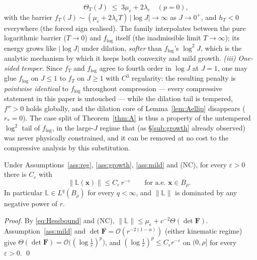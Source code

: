 \begin{remark}
\begin{equation*}
        \qquad
        \Theta_T(J)\;\le\;3\mu_e+2\lambda_e \quad (p=0),
    \end{equation*}
    with the barrier $f_T(J)\sim(\mu_e+2\lambda_e T)\,|\log J|\to\infty$ as $J\to0^+$, and $h_T<0$ everywhere
    (the forced sign realised). The family interpolates between the pure logarithmic barrier ($T\to0$) and $f_{\log}$
    itself (the inadmissible limit $T\to\infty$); its energy grows like $|\log J|$ under dilation, \emph{softer} than
    $f_{\log}$'s $\log^2 J$, which is the analytic mechanism by which it keeps both convexity and mild growth.
    \emph{(iii) One-sided temper.} Since $f_T$ and $f_{\log}$ agree to fourth order in $\log J$ at $J=1$, one may glue
    $f_{\log}$ on $J\le1$ to $f_T$ on $J\ge1$ with $C^3$ regularity: the resulting penalty is \emph{pointwise
    identical} to $f_{\log}$ throughout compression --- every compressive statement in this paper is untouched ---
    while the dilation tail is tempered, $f''>0$ holds globally, and the dilation core of Lemma~\ref{lem:Aellip}
    disappears ($r_*=0$). The case split of Theorem~\ref{thm:A} is thus a property of the untempered $\log^2$ tail of
    $f_{\log}$, in the large-$J$ regime that (as \S\ref{sub:growth} already observed) was never physically
    constrained, and it can be removed at no cost to the compressive analysis by this substitution.
\end{remark}

\begin{lemma}
    \label{lem:Abound}
    Under Assumptions~\ref{ass:reg}, \ref{ass:growth}, \ref{ass:mild} and (NC), for every $\varepsilon>0$ there is
    $C_\varepsilon$ with
    \begin{equation}
        \label{eq:subord}
        \|\mathbb{L}(\bm{x})\| \le C_\varepsilon\, r^{-\varepsilon} \qquad \text{for a.e. } \bm{x}\in B_\rho .
    \end{equation}
    In particular $\mathbb{L}\in L^q(B_\rho)$ for every $q<\infty$, and $\|\mathbb{L}\|$ is dominated by any negative
    power of $r$.
\end{lemma}

\begin{proof}
    By \eqref{eq:Hessbound} and (NC), $\|\mathbb{L}\|\le \mu_e + c^{-2}\Theta(\det\bm{F})$. Assumption~\ref{ass:mild}
    and $\det\bm{F}=\mathcal{O}(r^{-2(1-\alpha)})$ (either kinematic regime) give
    $\Theta(\det\bm{F})=\mathcal{O}\big((\log\tfrac1r)^p\big)$, and
    $(\log\tfrac1r)^p\le C_\varepsilon r^{-\varepsilon}$ on $(0,\rho]$ for every $\varepsilon>0$. \qed
\end{proof}

